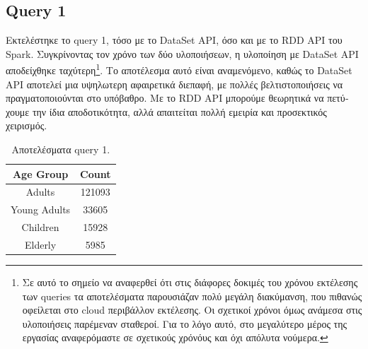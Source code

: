 \documentclass[a4paper,12pt]{article}
\begin{document}
\begin{otherlanguage}{greek}
\section*{Query 1}
	\FloatBarrier
	Εκτελέστηκε το query 1, τόσο με το DataSet API, όσο και με το RDD API του Spark.
	Συγκρίνοντας τον χρόνο των δύο υλοποιήσεων, η υλοποίηση με DataSet API
	αποδείχθηκε ταχύτερη\footnote{Σε αυτό το σημείο να αναφερθεί
	ότι στις διάφορες δοκιμές του χρόνου
	εκτέλεσης των queries τα αποτελέσματα παρουσιάζαν πολύ μεγάλη διακύμανση, που
	πιθανώς οφείλεται στο cloud περιβάλλον εκτέλεσης. Οι σχετικοί χρόνοι όμως
	ανάμεσα στις υλοποιήσεις παρέμεναν σταθεροί. Για το λόγο αυτό, στο μεγαλύτερο
	μέρος της εργασίας αναφερόμαστε σε σχετικούς χρόνόυς και όχι απόλυτα νούμερα.}.
	Το αποτέλεσμα αυτό είναι αναμενόμενο, καθώς το DataSet API αποτελεί μια
	υψηλωτερη αφαιρετικά διεπαφή, με πολλές βελτιστοποιήσεις να πραγματοποιούνται
	στο υπόβαθρο. Με το RDD API μπορούμε θεωρητικά να πετύχουμε την ίδια
	αποδοτικότητα, αλλά απαιτείται πολλή εμειρία και προσεκτικός χειρισμός.
	\begin{table}[h]
		\centering
		\begin{tabular}{cc}
			Age Group & Count \\
			\hline
			Adults & 121093 \\
			Young Adults & 33605 \\
			Children & 15928 \\
			Elderly & 5985
		\end{tabular}
		\caption{Αποτελέσματα query 1.}
	\end{table}
	\FloatBarrier


\end{otherlanguage}
\end{document}
